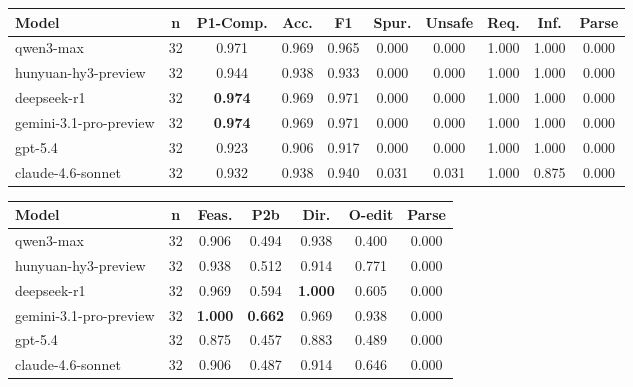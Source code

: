 \begin{center}
\label{tab:appendix_circuit_p1}
\scriptsize
\setlength{\tabcolsep}{3.5pt}
\renewcommand{\arraystretch}{1.08}
\begin{tabular}{lccccccccc}
\toprule
Model & n & P1-Comp. & Acc. & F1 & Spur. & Unsafe & Req. & Inf. & Parse \\
\midrule
qwen3-max & 32 & 0.971 & 0.969 & 0.965 & 0.000 & 0.000 & 1.000 & 1.000 & 0.000 \\
hunyuan-hy3-preview & 32 & 0.944 & 0.938 & 0.933 & 0.000 & 0.000 & 1.000 & 1.000 & 0.000 \\
deepseek-r1 & 32 & \textbf{0.974} & 0.969 & 0.971 & 0.000 & 0.000 & 1.000 & 1.000 & 0.000 \\
gemini-3.1-pro-preview & 32 & \textbf{0.974} & 0.969 & 0.971 & 0.000 & 0.000 & 1.000 & 1.000 & 0.000 \\
gpt-5.4 & 32 & 0.923 & 0.906 & 0.917 & 0.000 & 0.000 & 1.000 & 1.000 & 0.000 \\
claude-4.6-sonnet & 32 & 0.932 & 0.938 & 0.940 & 0.031 & 0.031 & 1.000 & 0.875 & 0.000 \\
\bottomrule
\end{tabular}
\end{center}

\begin{center}
\label{tab:appendix_circuit_p2}
\scriptsize
\setlength{\tabcolsep}{4pt}
\renewcommand{\arraystretch}{1.08}
\begin{tabular}{lcccccc}
\toprule
Model & n & Feas. & P2b & Dir. & O-edit & Parse \\
\midrule
qwen3-max & 32 & 0.906 & 0.494 & 0.938 & 0.400 & 0.000 \\
hunyuan-hy3-preview & 32 & 0.938 & 0.512 & 0.914 & 0.771 & 0.000 \\
deepseek-r1 & 32 & 0.969 & 0.594 & \textbf{1.000} & 0.605 & 0.000 \\
gemini-3.1-pro-preview & 32 & \textbf{1.000} & \textbf{0.662} & 0.969 & 0.938 & 0.000 \\
gpt-5.4 & 32 & 0.875 & 0.457 & 0.883 & 0.489 & 0.000 \\
claude-4.6-sonnet & 32 & 0.906 & 0.487 & 0.914 & 0.646 & 0.000 \\
\bottomrule
\end{tabular}
\end{center}


